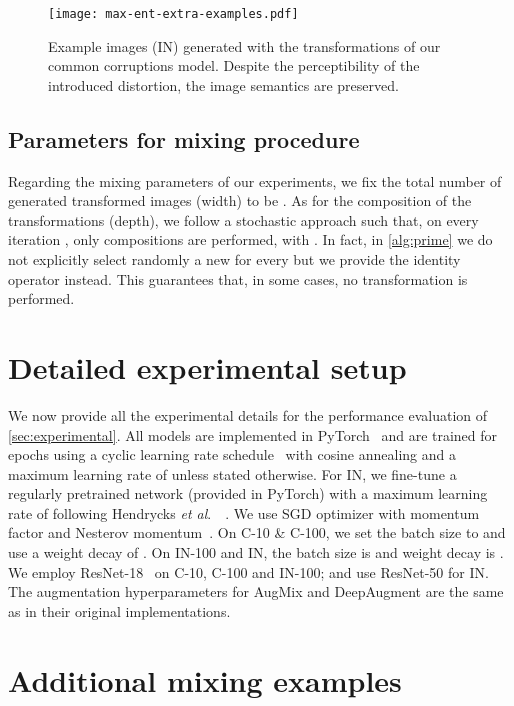 \documentclass[runningheads]{llncs}
\def\etal{\emph{et al}.~}
\begin{document}
\begin{figure}[t]
    \centering
    \texttt{[image: max-ent-extra-examples.pdf]}
    \caption{Example images (IN) generated with the transformations of our common corruptions model. Despite the perceptibility of the introduced distortion, the image semantics are preserved.}
    \vspace{-0.8em}
\label{fig:extra_ex_max_ent}
\end{figure}

\clearpage
\newpage

\subsection{Parameters for mixing procedure}
Regarding the mixing parameters of our experiments, we fix the total number of generated transformed images (width) to be . As for the composition of the transformations (depth), we follow a stochastic approach such that, on every iteration , only  compositions are performed, with . In fact, in \cref{alg:prime} we do not explicitly select randomly a new  for every  but we provide the identity operator  instead. This guarantees that, in some cases, no transformation is performed.

\section{Detailed experimental setup}
\label{app:exp-setup}

We now provide all the experimental details for the performance evaluation of \cref{sec:experimental}. All models are implemented in PyTorch~\cite{torch2019} and are trained for  epochs using a cyclic learning rate schedule~\cite{cyclic2018} with cosine annealing and a maximum learning rate of  unless stated otherwise. For IN, we fine-tune a regularly pretrained network (provided in PyTorch) with a maximum learning rate of  following Hendrycks \etal~\cite{deepaugment2021}. We use SGD optimizer with momentum factor  and Nesterov momentum~\cite{nesterov1983}. On C-10 \& C-100, we set the batch size to  and use a weight decay of . On IN-100 and IN, the batch size is  and weight decay is . We employ ResNet-18~\cite{resnet2016} on C-10, C-100 and IN-100; and use ResNet-50 for IN. The augmentation hyperparameters for AugMix and DeepAugment are the same as in their original implementations. 


\section{Additional mixing examples}
\label{app:mixing_examples}
\end{document}
